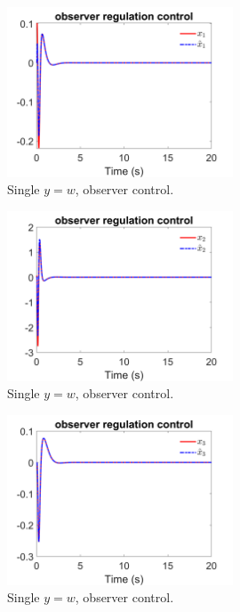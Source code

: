 \documentclass[12pt]{article}
\numberwithin{equation}{section}
\begin{document}
\begin{figure}[!ht]
    \centering
    \includegraphics[width=0.6\textwidth]{single_output_observer/fig5.png}
    \caption{Single $y = w$, observer control.}
\end{figure}

\begin{figure}[!ht]
    \centering
    \includegraphics[width=0.6\textwidth]{single_output_observer/fig6.png}
    \caption{Single $y = w$, observer control.}
\end{figure}

\begin{figure}[!ht]
    \centering
    \includegraphics[width=0.6\textwidth]{single_output_observer/fig7.png}
    \caption{Single $y = w$, observer control.}
\end{figure}
\end{document}
